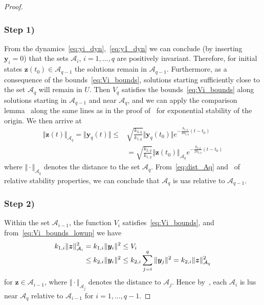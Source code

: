 \documentclass[../main.tex]{subfiles}
\begin{document}
\begin{proof}
\subsubsection{Step 1)} 
From the dynamics~\eqref{eq:yi_dyn},~\eqref{eq:y1_dyn} we can conclude (by inserting $\bm{y}_i = 0$) that the sets $\mathcal{A}_i$, $i=1,...,q$ are positively invariant. Therefore, for initial states $\bm{z}(t_0) \in \mathcal{A}_{q-1}$ the solutions remain in $\mathcal{A}_{q-1}$. Furthermore, as a consequence of the bounds~\eqref{eq:Vi_bounds},  solutions starting sufficiently close to the set $\mathcal{A}_q$ will remain in $U$.  Then $V_q$ satisfies the bounds~\eqref{eq:Vi_bounds} along solutions starting in $\mathcal{A}_{q-1}$ and near $\mathcal{A}_q$, and we can apply the comparison lemma~\citep[Lemma 3.4]{Khalil} along the same lines as in the proof of~\citep[Theorem 4.10]{Khalil} for exponential stability of the origin. We then arrive at
\vspace{-3pt}
\begin{equation}\label{eq:dist_Aq}
    \begin{split}
        \!\! \Vert \bm{z}(t) \Vert_{\mathcal{A}_q} = \Vert \bm{y}_q(t) \Vert \leq&{} \sqrt{\tfrac{k_{2,q}}{k_{1,q}}} \Vert \bm{y}_q(t_0) \Vert e^{-\frac{k_{3,q}}{2k_{2,q}}(t-t_0)}\\
        &= \sqrt{\tfrac{k_{2,q}}{k_{1,q}}} \Vert \bm{z}(t_0) \Vert_{\mathcal{A}_q} e^{-\frac{k_{3,q}}{2k_{2,q}}(t-t_0)}\!\!
    \end{split}
\end{equation}
where $\Vert \cdot \Vert_{\mathcal{A}_q}$ denotes the distance to the set $\mathcal{A}_q$. From~\eqref{eq:dist_Aq} and~\citep[Definition 12]{Maggiore2023} of relative stability properties, we can conclude that $\mathcal{A}_q$ is \gls{uas} relative to $\mathcal{A}_{q-1}$.

\vspace{-7pt}
\subsubsection{Step 2)} Within the set $\mathcal{A}_{i-1}$, the function $V_i$ satisfies~\eqref{eq:Vi_bounds}, and from~\eqref{eq:Vi_bounds_lowup} we have
\begin{equation}
    \begin{split}
        k_{1,i} \Vert \bm{z} \Vert_{\mathcal{A}_i}^2 &= k_{1,i} \Vert \bm{y}_i \Vert^2 \leq V_i\\[-5pt]
        &\leq  k_{2,i} \Vert \bm{y}_i \Vert^2 \leq k_{2,i} \sum_{j=i}^{q} \Vert \bm{y}_j \Vert^2 = k_{2,i} \Vert \bm{z} \Vert_{\mathcal{A}_q}^2
    \end{split} \vspace{-5pt}   
\end{equation}
for $\bm{z} \in \mathcal{A}_{i-1}$, where $\Vert \cdot \Vert_{\mathcal{A}_j}$ denotes the distance to $\mathcal{A}_j$. Hence by~\cite[Proposition 25]{Maggiore2023}, each $\mathcal{A}_i$ is \gls{lus} near $\mathcal{A}_q$ relative to $\mathcal{A}_{i-1}$ for $i=1,...,q-1$. 


\end{proof}
\end{document}
